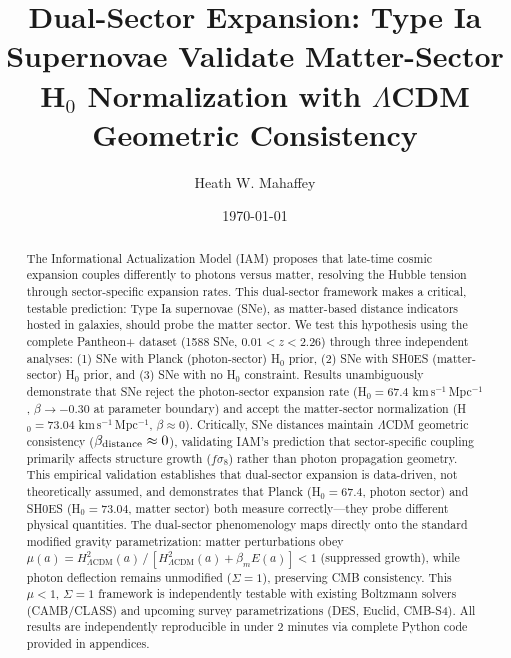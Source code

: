 \documentclass[twocolumn,superscriptaddress,prd,amsmath,amssymb]{revtex4-2}
\begin{document}
\title{Dual-Sector Expansion: Type Ia Supernovae Validate Matter-Sector H$_0$ Normalization with $\Lambda$CDM Geometric Consistency}

\author{Heath W. Mahaffey}

\date{\today}

\begin{abstract}
The Informational Actualization Model (IAM) proposes that late-time cosmic expansion couples differently to photons versus matter, resolving the Hubble tension through sector-specific expansion rates. This dual-sector framework makes a critical, testable prediction: Type Ia supernovae (SNe), as matter-based distance indicators hosted in galaxies, should probe the matter sector. We test this hypothesis using the complete Pantheon+ dataset (1588 SNe, $0.01 < z < 2.26$) through three independent analyses: (1) SNe with Planck (photon-sector) H$_0$ prior, (2) SNe with SH0ES (matter-sector) H$_0$ prior, and (3) SNe with no H$_0$ constraint. Results unambiguously demonstrate that SNe reject the photon-sector expansion rate (H$_0 = 67.4$ km\,s$^{-1}$\,Mpc$^{-1}$, $\beta \to -0.30$ at parameter boundary) and accept the matter-sector normalization (H$_0 = 73.04$ km\,s$^{-1}$\,Mpc$^{-1}$, $\beta \approx 0$). Critically, SNe distances maintain $\Lambda$CDM geometric consistency ($\beta_{\rm distance} \approx 0$), validating IAM's prediction that sector-specific coupling primarily affects structure growth ($f\sigma_8$) rather than photon propagation geometry. This empirical validation establishes that dual-sector expansion is data-driven, not theoretically assumed, and demonstrates that Planck (H$_0 = 67.4$, photon sector) and SH0ES (H$_0 = 73.04$, matter sector) both measure correctly---they probe different physical quantities. The dual-sector phenomenology maps directly onto the standard modified gravity parametrization: matter perturbations obey $\mu(a) = H^2_{\Lambda\text{CDM}}(a)\,/\,[H^2_{\Lambda\text{CDM}}(a) + \beta_m E(a)] < 1$ (suppressed growth), while photon deflection remains unmodified ($\Sigma = 1$), preserving CMB consistency. This $\mu < 1$, $\Sigma = 1$ framework is independently testable with existing Boltzmann solvers (CAMB/CLASS) and upcoming survey parametrizations (DES, Euclid, CMB-S4). All results are independently reproducible in under 2 minutes via complete Python code provided in appendices.
\end{abstract}

\maketitle
\end{document}
